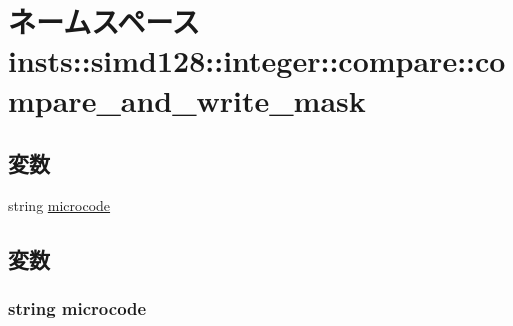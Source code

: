 \hypertarget{namespaceinsts_1_1simd128_1_1integer_1_1compare_1_1compare__and__write__mask}{
\section{ネームスペース insts::simd128::integer::compare::compare\_\-and\_\-write\_\-mask}
\label{namespaceinsts_1_1simd128_1_1integer_1_1compare_1_1compare__and__write__mask}
}
\subsection*{変数}
\begin{DoxyCompactItemize}
\item 
string \hyperlink{namespaceinsts_1_1simd128_1_1integer_1_1compare_1_1compare__and__write__mask_a770f11a173e99389a8802f0107ed8f52}{microcode}
\end{DoxyCompactItemize}


\subsection{変数}
\hypertarget{namespaceinsts_1_1simd128_1_1integer_1_1compare_1_1compare__and__write__mask_a770f11a173e99389a8802f0107ed8f52}{
\subsubsection[{microcode}]{\setlength{\rightskip}{0pt plus 5cm}string {\bf microcode}}}
\label{namespaceinsts_1_1simd128_1_1integer_1_1compare_1_1compare__and__write__mask_a770f11a173e99389a8802f0107ed8f52}
